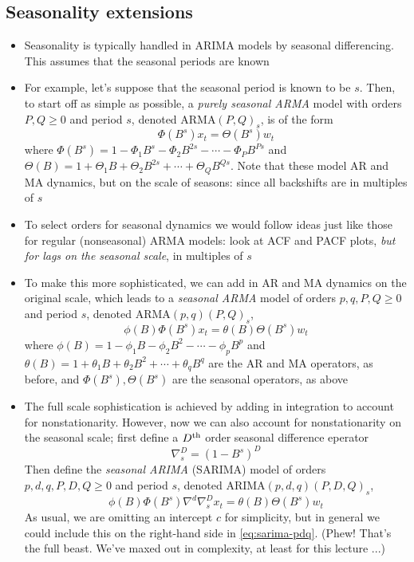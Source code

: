 \documentclass{article}
\begin{document}
\subsection{Seasonality extensions}

\begin{itemize}
\item Seasonality is typically handled in ARIMA models by seasonal
  differencing. This assumes that the seasonal periods are known

\item For example, let's suppose that the seasonal period is known to be
  $s$. Then, to start off as simple as possible, a \emph{purely seasonal ARMA}
  model with orders $P,Q \geq 0$ and period $s$, denoted ARMA$(P,Q)_s$, is of 
  the form   
  \begin{equation}
  \label{eq:pure-sarma-pq}
  \Phi(B^s) x_t = \Theta(B^s) w_t  
  \end{equation}
  where $\Phi(B^s) = 1 - \Phi_1 B^s - \Phi_2 B^{2s} - \cdots - \Phi_P B^{Ps}$
  and $\Theta(B) = 1 + \Theta_1 B + \Theta_2 B^{2s} + \cdots + \Theta_Q
  B^{Qs}$. Note that these model AR and MA dynamics, but on the scale of
  seasons: since all backshifts are in multiples of $s$

\item To select orders for seasonal dynamics we would follow ideas just like
  those for regular (nonseasonal) ARMA models: look at ACF and PACF plots,
  \emph{but for lags on the seasonal scale}, in multiples of $s$ 

\item To make this more sophisticated, we can add in AR and MA dynamics on
  the original scale, which leads to a \emph{seasonal ARMA} model of orders 
  $p,q,P,Q \geq 0$ and period $s$, denoted ARMA$(p,q)(P,Q)_s$,   
  \begin{equation}
  \label{eq:sarma-pq}
  \phi(B) \Phi(B^s) x_t = \theta(B) \Theta(B^s) w_t  
  \end{equation}
  where $\phi(B) = 1 - \phi_1 B - \phi_2 B^2 - \cdots - \phi_p B^p$ and
  $\theta(B) = 1 + \theta_1 B + \theta_2 B^2 + \cdots + \theta_q B^q$ are the AR 
  and MA operators, as before, and $\Phi(B^s), \Theta(B^s)$ are the seasonal
  operators, as above

\item The full scale sophistication is achieved by adding in integration to
  account for nonstationarity. However, now we can also account for
  nonstationarity on the seasonal scale; first define a $D^{\textnormal{th}}$ order seasonal
  difference eperator
  \[
  \nabla_s^D = (1 - B^s)^D 
  \]
  Then define the \emph{seasonal ARIMA} (SARIMA) model of orders $p,d,q,P,D,Q 
  \geq 0$ and period $s$, denoted ARIMA$(p,d,q)(P,D,Q)_s$, 
  \begin{equation}
  \label{eq:sarima-pdq}
  \phi(B) \Phi(B^s) \nabla^d \nabla_s^D x_t = \theta(B) \Theta(B^s) w_t  
  \end{equation}
  As usual, we are omitting an intercept $c$ for simplicity, but in general we
  could include this on the right-hand side in \eqref{eq:sarima-pdq}. (Phew!
  That's the full beast. We've maxed out in complexity, at least for this
  lecture ...) 


\end{itemize}
\end{document}
